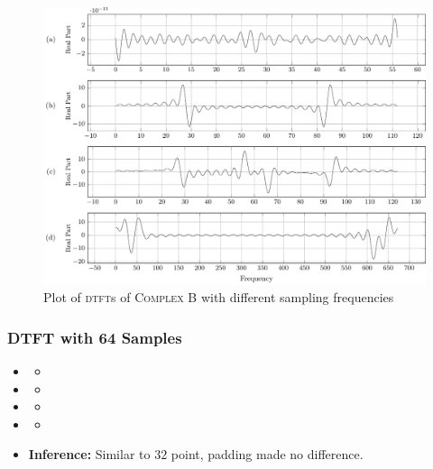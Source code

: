\documentclass[../../course]{subfiles}
\begin{document}
\begin{figure} [H]
    \centering
     {
        \includegraphics[height = 0.8\textheight] {tikzpics/plotDtftComplexB32.pdf}
    }
     {Plot of \textsc{dtft}s of \textsc{Complex B} with different sampling frequencies}
    \label{plt:dtftCplxB32}
\end{figure}

\subsubsection{DTFT with 64 Samples}

\begin{itemize} [label=]

    \item \sampFreqMuchLess
        \begin{itemize} [label=]
            \item
        \end{itemize}

    \item \sampFreqNorm
        \begin{itemize} [label=]
            \item
        \end{itemize}

    \item \sampFreqSligGreat
        \begin{itemize} [label=]
            \item
        \end{itemize}

    \item \sampFreqMuchGreat
        \begin{itemize} [label=]
            \item
        \end{itemize}

    \item \textbf{Inference:} Similar to $32$ point, padding made no difference.

\end{itemize}
\end{document}
